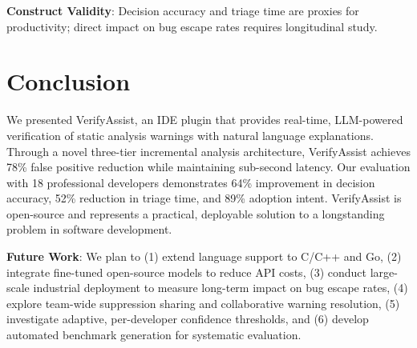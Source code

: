 \documentclass[conference]{IEEEtran}
\begin{document}
\textbf{Construct Validity}: Decision accuracy and triage time are proxies for productivity; direct impact on bug escape rates requires longitudinal study.

\section{Conclusion}

We presented VerifyAssist, an IDE plugin that provides real-time, LLM-powered verification of static analysis warnings with natural language explanations. Through a novel three-tier incremental analysis architecture, VerifyAssist achieves 78\% false positive reduction while maintaining sub-second latency. Our evaluation with 18 professional developers demonstrates 64\% improvement in decision accuracy, 52\% reduction in triage time, and 89\% adoption intent. VerifyAssist is open-source and represents a practical, deployable solution to a longstanding problem in software development.

\textbf{Future Work}: We plan to (1) extend language support to C/C++ and Go, (2) integrate fine-tuned open-source models to reduce API costs, (3) conduct large-scale industrial deployment to measure long-term impact on bug escape rates, (4) explore team-wide suppression sharing and collaborative warning resolution, (5) investigate adaptive, per-developer confidence thresholds, and (6) develop automated benchmark generation for systematic evaluation.
\end{document}
